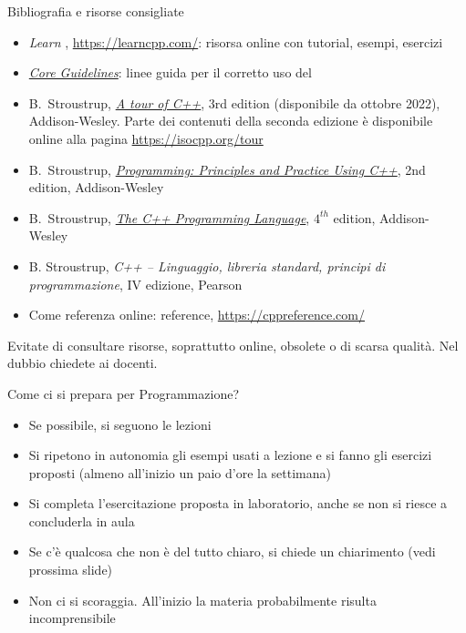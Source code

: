 \begin{frame}{Bibliografia e risorse consigliate}

  \begin{itemize}

  \item \textit{Learn \Cpp{}}, \url{https://learncpp.com/}: risorsa online con
    tutorial, esempi, esercizi

  \item
    \href{https://isocpp.github.io/CppCoreGuidelines/CppCoreGuidelines}{\textit{\Cpp{}
        Core Guidelines}}: linee guida per il corretto uso del \Cpp{}

  \item B.~Stroustrup, \href{https://stroustrup.com/tour3.html}{\textit{A tour
        of C++}}, 3rd edition (disponibile da ottobre 2022), Addison-Wesley.
    Parte dei contenuti della seconda edizione è disponibile online alla pagina
    \url{https://isocpp.org/tour}

  \item B.~Stroustrup,
    \href{https://stroustrup.com/programming.html}{\textit{Programming:
        Principles and Practice Using C++}}, 2nd edition, Addison-Wesley

  \item B.~Stroustrup, \href{https://stroustrup.com/4th.html}{\textit{The C++
        Programming Language}}, $4^{th}$ edition, Addison-Wesley

  \item B. Stroustrup, \textit{C++ -- Linguaggio, libreria standard, principi
      di programmazione}, IV edizione, Pearson

  \item Come referenza online: \Cpp{} reference, \url{https://cppreference.com/}

  \end{itemize}

  Evitate di consultare risorse, soprattutto online, obsolete o di scarsa
  qualità. Nel dubbio chiedete ai docenti.

\end{frame}

\begin{frame}{Come ci si prepara per Programmazione?}

  \begin{itemize}
  \item Se possibile, si seguono le lezioni
  \item Si ripetono in autonomia gli esempi usati a lezione e si fanno gli
    esercizi proposti (almeno all'inizio un paio d'ore la settimana)
  \item Si completa l'esercitazione proposta in laboratorio, anche se non si
    riesce a concluderla in aula
  \item Se c'è qualcosa che non è del tutto chiaro, si chiede un chiarimento
    (vedi prossima slide)
  \item Non ci si scoraggia. All'inizio la materia probabilmente risulta
    incomprensibile
  \end{itemize}
  
\end{frame}

